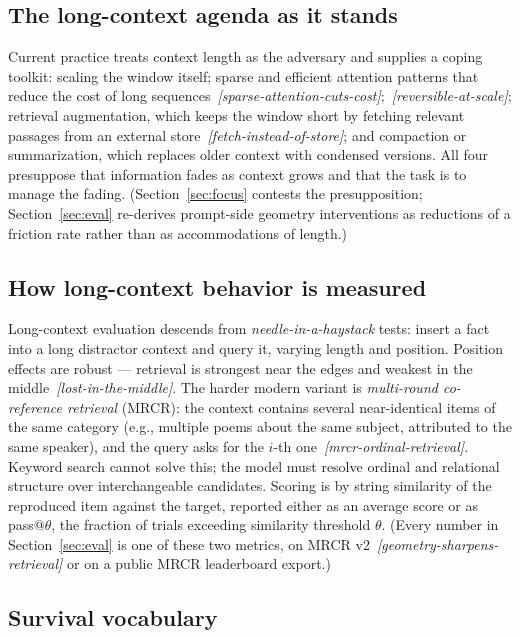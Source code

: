 \documentclass[11pt]{article}
\theoremstyle{remark}
\newif\ifslugs \slugstrue  %
\newcommand{\slug}[1]{\ifslugs\,{\small\textit{[#1]}}\fi}
\begin{document}
\subsection{The long-context agenda as it stands}

Current practice treats context length as the adversary and supplies a coping
toolkit: scaling the window itself; sparse and efficient attention patterns
that reduce the cost of long sequences \citep{child2019sparse}\slug{sparse-attention-cuts-cost}; \citep{kitaev2020reformer}\slug{reversible-at-scale}; retrieval augmentation, which keeps the window short by
fetching relevant passages from an external store \citep{lewis2020rag}\slug{fetch-instead-of-store}; and
compaction or summarization, which replaces older context with condensed
versions. All four presuppose that information fades as context grows and that
the task is to manage the fading. (Section~\ref{sec:focus} contests the
presupposition; Section~\ref{sec:eval} re-derives prompt-side geometry
interventions as reductions of a friction rate rather than as accommodations
of length.)

\subsection{How long-context behavior is measured}

Long-context evaluation descends from \emph{needle-in-a-haystack} tests:
insert a fact into a long distractor context and query it, varying length and
position. Position effects are robust --- retrieval is strongest near the
edges and weakest in the middle \citep{liu2024lost}\slug{lost-in-the-middle}. The harder modern variant
is \emph{multi-round co-reference retrieval} (MRCR): the context contains
several near-identical items of the same category (e.g., multiple poems about
the same subject, attributed to the same speaker), and the query asks for the
$i$-th one \citep{vodrahalli2024michelangelo}\slug{mrcr-ordinal-retrieval}. Keyword search cannot solve
this; the model must resolve ordinal and relational structure over
interchangeable candidates. Scoring is by string similarity of the reproduced
item against the target, reported either as an average score or as
pass@$\theta$, the fraction of trials exceeding similarity threshold $\theta$.
(Every number in Section~\ref{sec:eval} is one of these two metrics, on MRCR
v2 \citep{franz2026lens}\slug{geometry-sharpens-retrieval} or on a public MRCR leaderboard export.)

\subsection{Survival vocabulary}
\end{document}

